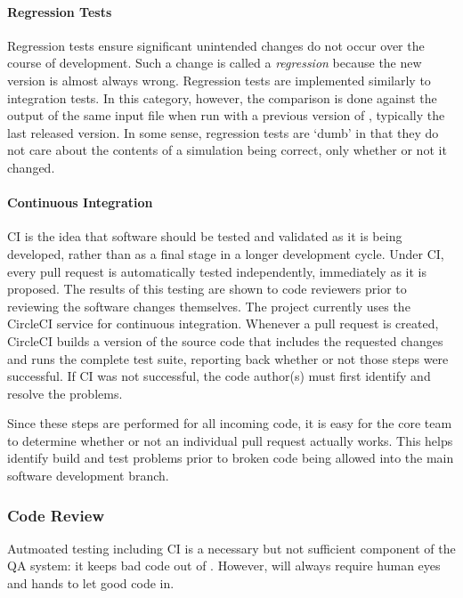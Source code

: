 \paragraph{Regression Tests}

Regression tests ensure significant unintended changes do not
occur over the course of \Cyclus development. Such a change is called a
\emph{regression} because the new version is almost always wrong.
Regression tests are implemented similarly to integration tests.
In this category, however, the comparison is done against
the output of the same input file when run with a previous version of \Cyclus,
typically the last released version.
In some sense, regression tests are `dumb' in that they do
not care about the contents of a simulation being correct, only whether or not
it changed.

\paragraph{Continuous Integration}

\Gls{CI} is the idea that software should be tested
and validated as it is being developed, rather than as a final stage in a
longer development cycle.  Under \gls{CI}, every pull request is automatically
tested independently, immediately as it is proposed. The results of this
testing are shown to code reviewers prior to reviewing the software changes themselves.  The \Cyclus
project currently uses the CircleCI \cite{circleci} service for continuous integration.
Whenever a pull request is created, CircleCI builds a version of the \Cyclus
source code that includes the requested changes and runs the complete test
suite, reporting back whether or not those steps were successful. If \gls{CI}
was not successful, the code author(s) must first identify and resolve the
problems.

Since these steps are performed for all incoming code, it is easy for the
\Cyclus core team to determine whether or not an individual pull request
actually works. This helps identify build and test problems prior to broken
code being allowed into the main software development branch.  

\subsubsection{Code Review}
\label{sec:qa-review}

Autmoated testing including \gls{CI} is a necessary but not sufficient
component of the \Cyclus \gls{QA} system: it keeps bad code out of
\Cyclus. However, \Cyclus will always require human eyes and hands to let good
code in.  

